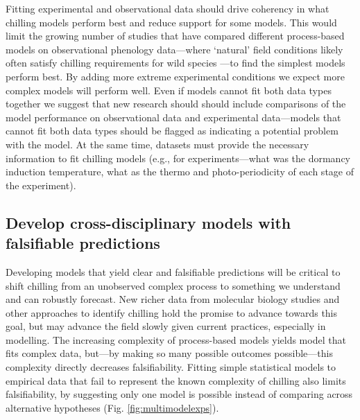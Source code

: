 \documentclass[11pt]{article}
\begin{document}
Fitting experimental and observational data should drive coherency in what chilling models perform best and reduce support for some models. This would limit the growing number of studies that have compared different process-based models on observational phenology data---where `natural' field conditions likely often satisfy chilling requirements for wild species \citep{basler2016evaluating,hufkens2018integrated}---to find the simplest models perform best. By adding more extreme experimental conditions we expect more complex models will perform well. Even if models cannot fit both data types together we suggest that new research should should include comparisons of the model performance on observational data and experimental data---models that cannot fit both data types should be flagged as indicating a potential problem with the model.  At the same time, datasets must provide the necessary information to fit chilling models (e.g., for experiments---what was the dormancy induction temperature, what as the thermo and photo-periodicity of each stage of the experiment). 


\subsection*{Develop cross-disciplinary models with falsifiable predictions} 
Developing models that yield clear and falsifiable predictions will be critical to shift chilling from an unobserved complex process to something we understand and can robustly forecast. New richer data from molecular biology studies and other approaches to identify chilling \citep{fouche2023transport,walde2024stable} hold the promise to advance towards this goal, but may advance the field slowly given current practices, especially in modelling. The increasing complexity of process-based models yields model that fits complex data, but---by making so many possible outcomes possible---this complexity directly decreases falsifiability. Fitting simple statistical models to empirical data that fail to represent the known complexity of chilling also limits falsifiability, by suggesting only one model is possible instead of comparing across alternative hypotheses (Fig. \ref{fig:multimodelexps}). 
\end{document}
